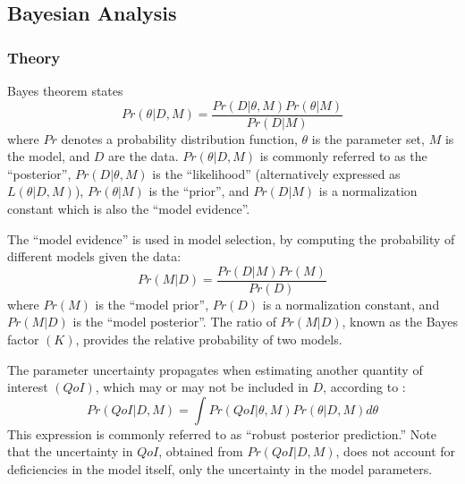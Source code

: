 \documentclass[preprint,letterpaper,floatfix,citeautoscript,aip,jcp]{revtex4-1}
\begin{document}
\subsection{Bayesian Analysis} \label{Bayesian Analysis}

\subsubsection{Theory}

Bayes theorem states
\begin{equation} \label{Bayes Theorem}
Pr(\theta|D,M) = \frac{Pr(D|\theta,M)Pr(\theta|M)}{Pr(D|M)}
\end{equation}
where $Pr$ denotes a probability distribution function, $\theta$ is the parameter set, $M$ is the model, and $D$ are the data. $Pr(\theta|D,M)$ is commonly referred to as the ``posterior'', $Pr(D|\theta,M)$ is the ``likelihood'' (alternatively expressed as $L(\theta|D,M)$), $Pr(\theta|M)$ is the ``prior'', and $Pr(D|M)$ is a normalization constant which is also the ``model evidence''. 


The ``model evidence'' is used in model selection, by computing the probability of different models given the data:
\begin{equation} \label{Model Selection}
Pr(M|D) = \frac{Pr(D|M)Pr(M)}{Pr(D)}
\end{equation}
where $Pr(M)$ is the ``model prior'', $Pr(D)$ is a normalization constant, and $Pr(M|D)$ is the ``model posterior''. The ratio of $Pr(M|D)$, known as the Bayes factor $(K)$, provides the relative probability of two models. 

The parameter uncertainty propagates when estimating another quantity of interest $(QoI)$, which may or may not be included in $D$, according to \cite{Kulakova2017}:
\begin{equation} \label{Posterior Prediction}
Pr(QoI|D,M) = \int Pr(QoI|\theta,M) Pr(\theta|D,M) d\theta
\end{equation}
This expression is commonly referred to as ``robust posterior prediction.'' Note that the uncertainty in $QoI$, obtained from $Pr(QoI|D,M)$, does not account for deficiencies in the model itself, only the uncertainty in the model parameters.
\end{document}
